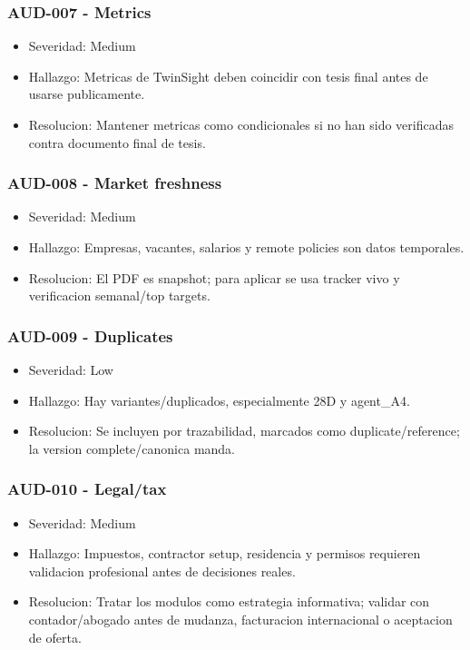 \subsubsection{AUD-007 - Metrics}


\begin{itemize}
\item Severidad: Medium
\item Hallazgo: Metricas de TwinSight deben coincidir con tesis final antes de usarse publicamente.
\item Resolucion: Mantener metricas como condicionales si no han sido verificadas contra documento final de tesis.
\end{itemize}


\subsubsection{AUD-008 - Market freshness}


\begin{itemize}
\item Severidad: Medium
\item Hallazgo: Empresas, vacantes, salarios y remote policies son datos temporales.
\item Resolucion: El PDF es snapshot; para aplicar se usa tracker vivo y verificacion semanal/top targets.
\end{itemize}


\subsubsection{AUD-009 - Duplicates}


\begin{itemize}
\item Severidad: Low
\item Hallazgo: Hay variantes/duplicados, especialmente 28D y agent\_A4.
\item Resolucion: Se incluyen por trazabilidad, marcados como duplicate/reference; la version complete/canonica manda.
\end{itemize}


\subsubsection{AUD-010 - Legal/tax}


\begin{itemize}
\item Severidad: Medium
\item Hallazgo: Impuestos, contractor setup, residencia y permisos requieren validacion profesional antes de decisiones reales.
\item Resolucion: Tratar los modulos como estrategia informativa; validar con contador/abogado antes de mudanza, facturacion internacional o aceptacion de oferta.
\end{itemize}


